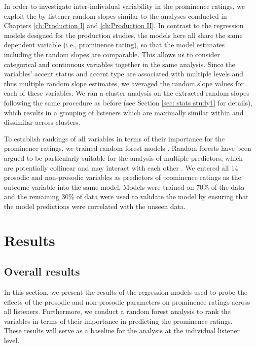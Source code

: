 In order to investigate inter-individual variability in the prominence ratings, we exploit the by-listener random slopes similar to the analyses conducted in Chapters \ref{ch:Production I} and \ref{ch:Production II}. In contrast to the regression models designed for the production studies, the models here all share the same dependent variable (i.e., prominence rating), so that the model estimates including the random slopes are comparable. This allows us to consider categorical and continuous variables together in the same analysis. Since the variables' accent status and accent type are associated with multiple levels and thus multiple random slope estimates, we averaged the random slope values for each of these variables. We ran a cluster analysis on the extracted random slopes following the same procedure as before (see Section \ref{sec: stats study1} for details), which results in a grouping of listeners which are maximally similar within and dissimilar across clusters.

To establish rankings of all variables in terms of their importance for the prominence ratings, we trained random forest models \citep{breimanRandomForests2001}. Random forests have been argued to be particularly suitable for the analysis of multiple predictors, which are potentially collinear and may interact with each other \citep[e.g.,][]{stroblIntroductionRecursivePartitioning2009}. We entered all 14 prosodic and non-prosodic variables as predictors of prominence ratings as the outcome variable into the same model. Models were trained on 70\% of the data and the remaining 30\% of data were used to validate the model by ensuring that the model predictions were correlated with the unseen data. 

\section{Results} \label{sec:s3_results}

\subsection{Overall results}

In this section, we present the results of the regression models used to probe the effects of the prosodic and non-prosodic parameters on prominence ratings across all listeners. Furthermore, we conduct a random forest analysis to rank the variables in terms of their importance in predicting the prominence ratings. These results will serve as a baseline for the analysis at the individual listener level.

